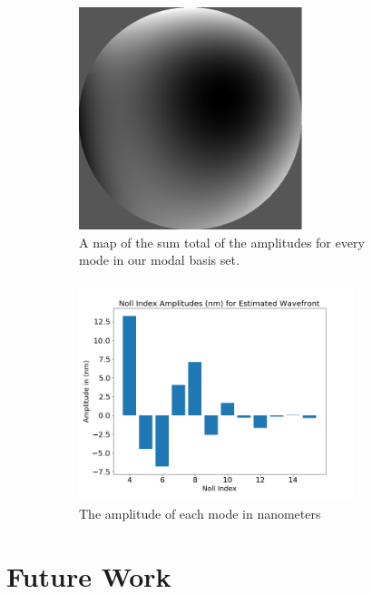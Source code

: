 \begin{figure}[H]
\centering
\begin{subfigure}{.5\textwidth}
  \centering
  \includegraphics[width=6.5cm]{Figures/wavefront_error.png}
  \caption{A map of the sum total of the amplitudes for every mode in our modal basis set.}
  \label{fig:wavefront_map}
\end{subfigure}%
\begin{subfigure}{.5\textwidth}
  \centering
  \includegraphics[width=8cm]{Figures/ampvnoll.png}
  \caption{The amplitude of each mode in nanometers}
  \label{fig:ampvsnoll}
\end{subfigure}
\caption{}
\label{fig:code_results}
\end{figure}


\section{Future Work}
\label{sec:future}